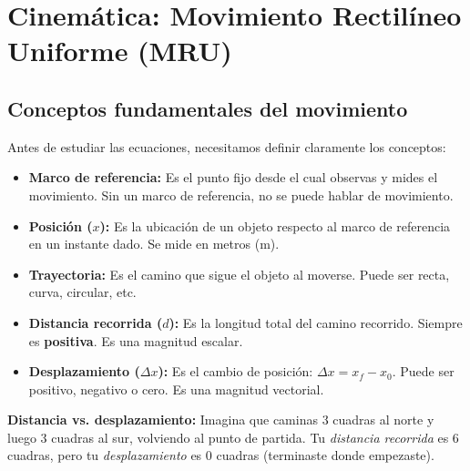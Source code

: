 \documentclass[12pt, a4paper]{article}
\begin{document}
\newpage

\section{Cinemática: Movimiento Rectilíneo Uniforme (MRU)}

\subsection{Conceptos fundamentales del movimiento}

Antes de estudiar las ecuaciones, necesitamos definir claramente los conceptos:

\begin{cuadroteoria}
\begin{itemize}[leftmargin=*]
  \item \textbf{Marco de referencia:} Es el punto fijo desde el cual observas y mides el movimiento. Sin un marco de referencia, no se puede hablar de movimiento.
  
  \item \textbf{Posición ($x$):} Es la ubicación de un objeto respecto al marco de referencia en un instante dado. Se mide en metros (m).
  
  \item \textbf{Trayectoria:} Es el camino que sigue el objeto al moverse. Puede ser recta, curva, circular, etc.
  
  \item \textbf{Distancia recorrida ($d$):} Es la longitud total del camino recorrido. Siempre es \textbf{positiva}. Es una magnitud escalar.
  
  \item \textbf{Desplazamiento ($\Delta x$):} Es el cambio de posición: $\Delta x = x_f - x_0$. Puede ser positivo, negativo o cero. Es una magnitud vectorial.
\end{itemize}
\end{cuadroteoria}

\begin{cuadroadvertencia}
\textbf{Distancia vs. desplazamiento:} Imagina que caminas 3 cuadras al norte y luego 3 cuadras al sur, volviendo al punto de partida. Tu \emph{distancia recorrida} es $6$ cuadras, pero tu \emph{desplazamiento} es $0$ cuadras (terminaste donde empezaste).
\end{cuadroadvertencia}
\end{document}
